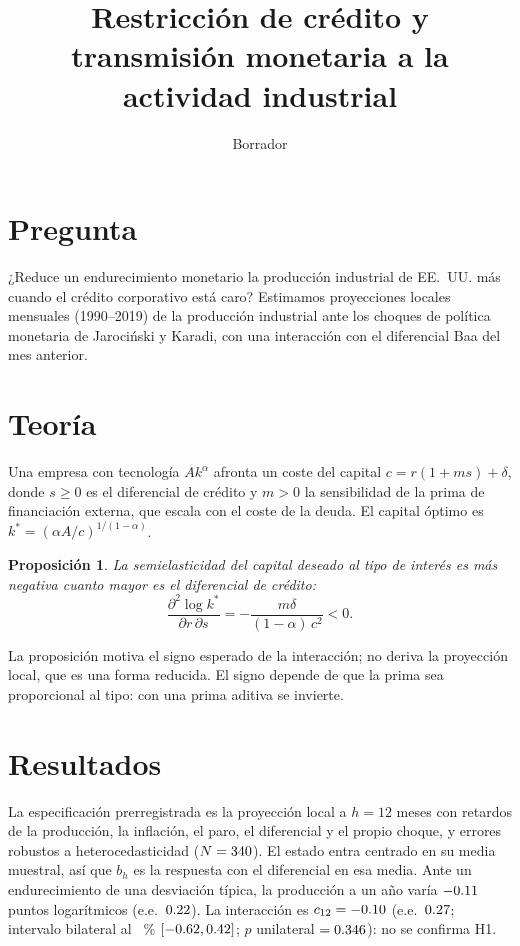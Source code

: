 \documentclass[11pt]{article}
\title{Restricción de crédito y transmisión monetaria a la actividad industrial}
\date{Borrador}
\newtheorem{proposition}{Proposición}
\begin{document}
\maketitle

\section{Pregunta}
¿Reduce un endurecimiento monetario la producción industrial de EE.~UU. más cuando el crédito corporativo está caro?
Estimamos proyecciones locales mensuales (1990--2019) de la producción industrial ante los choques de política monetaria
de Jarociński y Karadi, con una interacción con el diferencial Baa del mes anterior.

\section{Teoría}
Una empresa con tecnología $A k^\alpha$ afronta un coste del capital $c = r(1 + m s) + \delta$, donde $s \geq 0$ es el
diferencial de crédito y $m > 0$ la sensibilidad de la prima de financiación externa, que escala con el coste de la
deuda. El capital óptimo es $k^* = (\alpha A / c)^{1/(1-\alpha)}$.

\begin{proposition}
La semielasticidad del capital deseado al tipo de interés es más negativa cuanto mayor es el diferencial de crédito:
\[
  \frac{\partial^2 \log k^*}{\partial r \, \partial s} = -\frac{m \delta}{(1-\alpha)\, c^2} < 0 .
\]
\end{proposition}

La proposición motiva el signo esperado de la interacción; no deriva la proyección local, que es una forma reducida.
El signo depende de que la prima sea proporcional al tipo: con una prima aditiva se invierte.

\section{Resultados}
La especificación prerregistrada es la proyección local a $h = 12$ meses con \lags{} retardos de la producción, la
inflación, el paro, el diferencial y el propio choque, y errores robustos a heterocedasticidad ($N = 340$). El
estado entra centrado en su media muestral, así que $b_h$ es la respuesta con el diferencial en esa media. Ante un
endurecimiento de una desviación típica, la producción a un año varía $-0.11$ puntos logarítmicos
(e.e.~$0.22$). La interacción es $c_{12} = -0.10$ (e.e.~$0.27$; intervalo bilateral al
\ciLevel{}~\% $[-0.62, 0.42]$; $p$ unilateral $= 0.346$): no se confirma H1.
\end{document}
